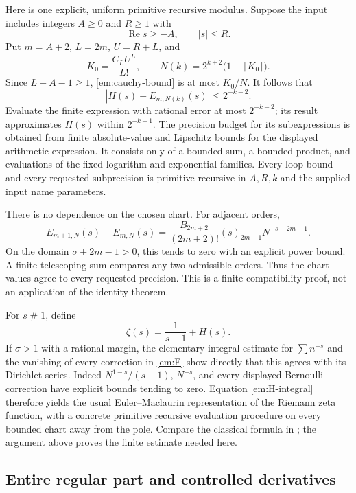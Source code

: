 Here is one explicit, uniform primitive recursive modulus.  Suppose the
input includes integers $A\geq0$ and $R\geq1$ with
\[
 \operatorname{Re}s\geq-A,\qquad |s|\leq R.
\]
Put $m=A+2$, $L=2m$, $U=R+L$, and
\begin{equation}
 K_0=\frac{C_L U^L}{L!},\qquad
 N(k)=2^{k+2}\bigl(1+\lceil K_0\rceil\bigr).
 \label{em:PR-modulus}
\end{equation}
Since $L-A-1\geq1$, \eqref{em:cauchy-bound} is at most $K_0/N$.
It follows that
\begin{equation}
 |H(s)-E_{m,N(k)}(s)|\leq2^{-k-2}.
 \label{em:explicit-evaluation}
\end{equation}
Evaluate the finite expression with rational error at most $2^{-k-2}$;
its result approximates $H(s)$ within $2^{-k-1}$.  The precision budget
for its subexpressions is obtained from finite absolute-value and
Lipschitz bounds for the displayed arithmetic expression.  It consists
only of a bounded sum, a bounded product, and evaluations of the fixed
logarithm and exponential families.  Every loop bound and every requested
subprecision is primitive recursive in $A,R,k$ and the supplied input
name parameters.

There is no dependence on the chosen chart.  For adjacent orders,
\[
 E_{m+1,N}(s)-E_{m,N}(s)
 =\frac{B_{2m+2}}{(2m+2)!}(s)_{2m+1}N^{-s-2m-1}.
\]
On the domain $\sigma+2m-1>0$, this tends to zero with an explicit power
bound.  A finite telescoping sum compares any two admissible orders.
Thus the chart values agree to every requested precision.  This is a
finite compatibility proof, not an application of the identity theorem.

For $s\mathrel{\#}1$, define
\begin{equation}
 \zeta(s)=\frac1{s-1}+H(s).
 \label{em:zeta-definition}
\end{equation}
If $\sigma>1$ with a rational margin, the elementary integral estimate
for $\sum n^{-s}$ and the vanishing of every correction in
\eqref{em:F} show directly that this agrees with its Dirichlet series.
Indeed $N^{1-s}/(s-1)$, $N^{-s}$, and every displayed Bernoulli correction
have explicit bounds tending to zero.  Equation \eqref{em:H-integral}
therefore yields the usual Euler--Maclaurin representation of the
Riemann zeta function, with a concrete primitive recursive evaluation
procedure on every bounded chart away from the pole.  Compare the
classical formula in \cite{DLMF25_2}; the argument above proves the
finite estimate needed here.

\subsection{Entire regular part and controlled derivatives}

